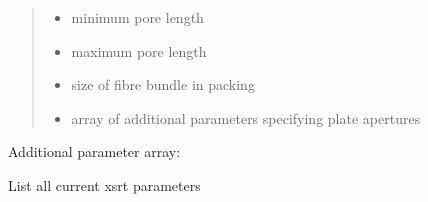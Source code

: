 \documentclass[letterpaper,10pt,english]{sphinxmanual}
\begin{document}
\begin{fulllineitems}
\begin{quote}
\begin{description}
\begin{itemize}
\item {} 
 \textendash{} minimum pore length

\item {} 
 \textendash{} maximum pore length

\item {} 
 \textendash{} size of fibre bundle in packing

\item {} 
 \textendash{} array of additional parameters specifying plate apertures

\end{itemize}

\end{description}\end{quote}
\begin{description}
\item[{Additional parameter array:}] \leavevmode
{}

\end{description}

\end{fulllineitems}


\begin{fulllineitems}
\label{\detokenize{xsrt_functions:xsrt.srtlist}}
List all current xsrt parameters

\end{fulllineitems}

\end{document}
